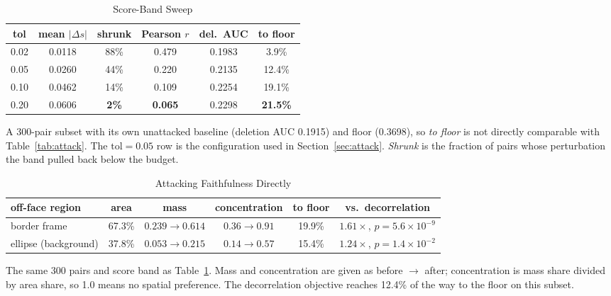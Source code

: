 \documentclass[conference,10pt]{IEEEtran}
\newcommand{\dsim}{\Delta s}
\begin{document}
\begin{table}[!t]
  \centering
  \caption{Score-Band Sweep}
  \label{tab:tol}
  \setlength{\tabcolsep}{4.5pt}
  \begin{tabular}{cccccc}
    \toprule
    tol & mean $\lvert\dsim\rvert$ & shrunk & Pearson $r$ & del.\ AUC & to floor \\
    \midrule
    0.02 & 0.0118 & 88\% & 0.479 & 0.1983 & \phantom{0}3.9\% \\
    0.05 & 0.0260 & 44\% & 0.220 & 0.2135 & 12.4\% \\
    0.10 & 0.0462 & 14\% & 0.109 & 0.2254 & 19.1\% \\
    0.20 & 0.0606 & \textbf{2\%} & \textbf{0.065} & 0.2298 & \textbf{21.5\%} \\
    \bottomrule
  \end{tabular}
  \vspace{2pt}
  \parbox{\columnwidth}{\footnotesize A 300-pair subset with its own unattacked baseline
  (deletion AUC 0.1915) and floor (0.3698), so \emph{to floor} is not directly comparable with
  Table~\ref{tab:attack}. The $\mathrm{tol} = 0.05$ row is the configuration used in
  Section~\ref{sec:attack}. \emph{Shrunk} is the fraction of pairs whose perturbation the band
  pulled back below the budget.}
\end{table}

\begin{table}[!t]
  \centering
  \caption{Attacking Faithfulness Directly}
  \label{tab:targetmode}
  \begin{tabular}{lccccc}
    \toprule
    off-face region & area & mass & concentration & to floor & vs.\ decorrelation \\
    \midrule
    border frame & 67.3\% & $0.239 \rightarrow 0.614$ & $0.36 \rightarrow 0.91$ & 19.9\% &
      $1.61\times$, $p = 5.6\!\times\!10^{-9}$ \\
    ellipse (background) & 37.8\% & $0.053 \rightarrow 0.215$ & $0.14 \rightarrow 0.57$ &
      15.4\% & $1.24\times$, $p = 1.4\!\times\!10^{-2}$ \\
    \bottomrule
  \end{tabular}
  \vspace{2pt}
  \parbox{0.92\textwidth}{\footnotesize The same 300 pairs and score band as
  Table~\ref{tab:tol}. Mass and concentration are given as before $\rightarrow$ after;
  concentration is mass share divided by area share, so 1.0 means no spatial preference. The
  decorrelation objective reaches 12.4\% of the way to the floor on this subset.}
\end{table}
\end{document}
